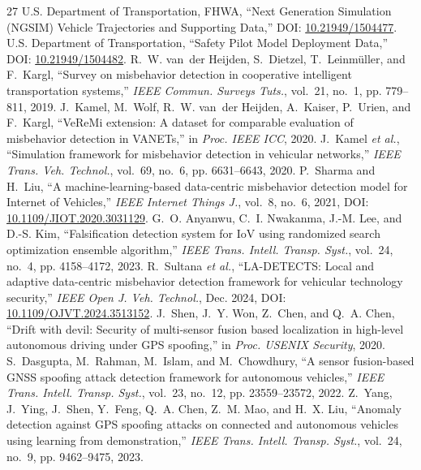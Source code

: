 \documentclass[journal]{IEEEtran}
\begin{document}
\begin{thebibliography}{27}
\setlength{\itemsep}{0pt}
\setlength{\parskip}{0pt}
U.S. Department of Transportation, FHWA, ``Next Generation Simulation (NGSIM) Vehicle Trajectories and Supporting Data,'' DOI: \url{10.21949/1504477}.
U.S. Department of Transportation, ``Safety Pilot Model Deployment Data,'' DOI: \url{10.21949/1504482}.
R.~W. van~der Heijden, S.~Dietzel, T.~Leinm\"uller, and F.~Kargl, ``Survey on misbehavior detection in cooperative intelligent transportation systems,'' \textit{IEEE Commun. Surveys Tuts.}, vol.~21, no.~1, pp. 779--811, 2019.
J.~Kamel, M.~Wolf, R.~W. van~der Heijden, A.~Kaiser, P.~Urien, and F.~Kargl, ``VeReMi extension: A dataset for comparable evaluation of misbehavior detection in VANETs,'' in \textit{Proc. IEEE ICC}, 2020.
J.~Kamel \textit{et al.}, ``Simulation framework for misbehavior detection in vehicular networks,'' \textit{IEEE Trans. Veh. Technol.}, vol.~69, no.~6, pp. 6631--6643, 2020.
P.~Sharma and H.~Liu, ``A machine-learning-based data-centric misbehavior detection model for Internet of Vehicles,'' \textit{IEEE Internet Things J.}, vol.~8, no.~6, 2021, DOI: \url{10.1109/JIOT.2020.3031129}.
G.~O. Anyanwu, C.~I. Nwakanma, J.-M. Lee, and D.-S. Kim, ``Falsification detection system for IoV using randomized search optimization ensemble algorithm,'' \textit{IEEE Trans. Intell. Transp. Syst.}, vol.~24, no.~4, pp. 4158--4172, 2023.
R.~Sultana \textit{et al.}, ``LA-DETECTS: Local and adaptive data-centric misbehavior detection framework for vehicular technology security,'' \textit{IEEE Open J. Veh. Technol.}, Dec. 2024, DOI: \url{10.1109/OJVT.2024.3513152}.
J.~Shen, J.~Y. Won, Z.~Chen, and Q.~A. Chen, ``Drift with devil: Security of multi-sensor fusion based localization in high-level autonomous driving under GPS spoofing,'' in \textit{Proc. USENIX Security}, 2020.
S.~Dasgupta, M.~Rahman, M.~Islam, and M.~Chowdhury, ``A sensor fusion-based GNSS spoofing attack detection framework for autonomous vehicles,'' \textit{IEEE Trans. Intell. Transp. Syst.}, vol.~23, no.~12, pp. 23559--23572, 2022.
Z.~Yang, J.~Ying, J.~Shen, Y.~Feng, Q.~A. Chen, Z.~M. Mao, and H.~X. Liu, ``Anomaly detection against GPS spoofing attacks on connected and autonomous vehicles using learning from demonstration,'' \textit{IEEE Trans. Intell. Transp. Syst.}, vol.~24, no.~9, pp. 9462--9475, 2023.

\end{thebibliography}
\end{document}
